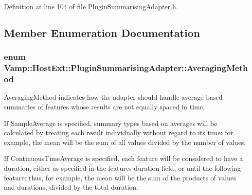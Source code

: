 Definition at line 104 of file Plugin\+Summarising\+Adapter.\+h.



\subsection{Member Enumeration Documentation}
\subsubsection[{\texorpdfstring{Averaging\+Method}{AveragingMethod}}]{\setlength{\rightskip}{0pt plus 5cm}enum {\bf Vamp\+::\+Host\+Ext\+::\+Plugin\+Summarising\+Adapter\+::\+Averaging\+Method}}\hypertarget{class_vamp_1_1_host_ext_1_1_plugin_summarising_adapter_a294e9eed9c541dcedbaa4f2dfda1ac76}{}\label{class_vamp_1_1_host_ext_1_1_plugin_summarising_adapter_a294e9eed9c541dcedbaa4f2dfda1ac76}
Averaging\+Method indicates how the adapter should handle average-\/based summaries of features whose results are not equally spaced in time.

If Sample\+Average is specified, summary types based on averages will be calculated by treating each result individually without regard to its time\+: for example, the mean will be the sum of all values divided by the number of values.

If Continuous\+Time\+Average is specified, each feature will be considered to have a duration, either as specified in the feature\textquotesingle{}s duration field, or until the following feature\+: thus, for example, the mean will be the sum of the products of values and durations, divided by the total duration.

